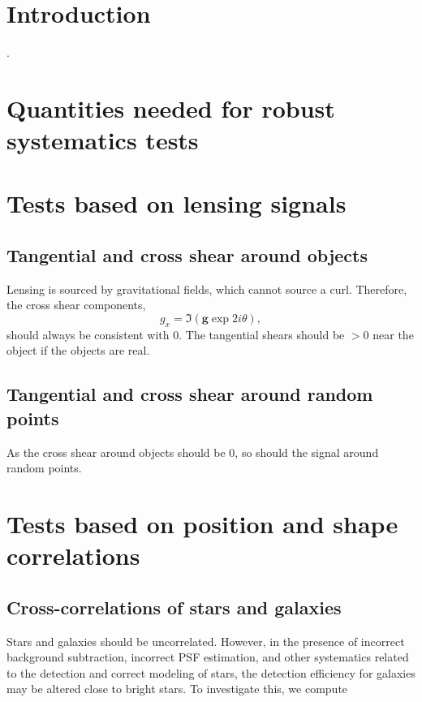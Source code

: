\documentclass{article}
\begin{document}
\section{Introduction}.


\section{Quantities needed for robust systematics tests}



\section{Tests based on lensing signals}

\subsection{Tangential and cross shear around objects}

Lensing is sourced by gravitational fields, which cannot source a curl.  Therefore, the cross shear components,
\begin{equation}
g_x = \Im(\mathbf{g}\exp{2i\theta}),
\end{equation}
should always be consistent with 0.  The tangential shears should be $>0$ near the object if the 
objects are real.

\subsection{Tangential and cross shear around random points}

As the cross shear around objects should be 0, so should the signal around random points.

\section{Tests based on position and shape correlations}

\subsection{Cross-correlations of stars and galaxies}

Stars and galaxies should be uncorrelated. However, in the presence of incorrect background subtraction, incorrect PSF estimation, and other systematics related to the detection and correct modeling of stars, the detection efficiency for galaxies may be altered close to bright stars.  To investigate this, we compute
\end{document}
